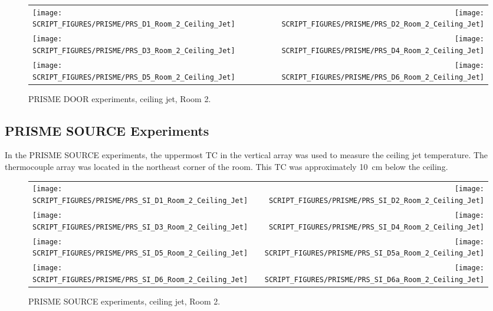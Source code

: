 \newpage

\begin{figure}[p]
\begin{tabular*}{\textwidth}{l@{\extracolsep{\fill}}r}
\texttt{[image: SCRIPT\_FIGURES/PRISME/PRS\_D1\_Room\_2\_Ceiling\_Jet]} &
\texttt{[image: SCRIPT\_FIGURES/PRISME/PRS\_D2\_Room\_2\_Ceiling\_Jet]} \\
\texttt{[image: SCRIPT\_FIGURES/PRISME/PRS\_D3\_Room\_2\_Ceiling\_Jet]} &
\texttt{[image: SCRIPT\_FIGURES/PRISME/PRS\_D4\_Room\_2\_Ceiling\_Jet]} \\
\texttt{[image: SCRIPT\_FIGURES/PRISME/PRS\_D5\_Room\_2\_Ceiling\_Jet]} &
\texttt{[image: SCRIPT\_FIGURES/PRISME/PRS\_D6\_Room\_2\_Ceiling\_Jet]}
\end{tabular*}
\caption{PRISME DOOR experiments, ceiling jet, Room 2.}
\label{PRISME_Ceiling_Jet_Room_2}
\end{figure}

\clearpage


\subsection{PRISME SOURCE Experiments}

In the PRISME SOURCE experiments, the uppermost TC in the vertical array was used to measure the ceiling jet temperature. The thermocouple array was located in the northeast corner of the room. This TC was approximately 10~cm below the ceiling.

\begin{figure}[!h]
\begin{tabular*}{\textwidth}{l@{\extracolsep{\fill}}r}
\texttt{[image: SCRIPT\_FIGURES/PRISME/PRS\_SI\_D1\_Room\_2\_Ceiling\_Jet]} &
\texttt{[image: SCRIPT\_FIGURES/PRISME/PRS\_SI\_D2\_Room\_2\_Ceiling\_Jet]} \\
\texttt{[image: SCRIPT\_FIGURES/PRISME/PRS\_SI\_D3\_Room\_2\_Ceiling\_Jet]} &
\texttt{[image: SCRIPT\_FIGURES/PRISME/PRS\_SI\_D4\_Room\_2\_Ceiling\_Jet]} \\
\texttt{[image: SCRIPT\_FIGURES/PRISME/PRS\_SI\_D5\_Room\_2\_Ceiling\_Jet]} &
\texttt{[image: SCRIPT\_FIGURES/PRISME/PRS\_SI\_D5a\_Room\_2\_Ceiling\_Jet]} \\
\texttt{[image: SCRIPT\_FIGURES/PRISME/PRS\_SI\_D6\_Room\_2\_Ceiling\_Jet]} &
\texttt{[image: SCRIPT\_FIGURES/PRISME/PRS\_SI\_D6a\_Room\_2\_Ceiling\_Jet]}
\end{tabular*}
\caption{PRISME SOURCE experiments, ceiling jet, Room 2.}
\label{PRISME_SOURCE_Ceiling_Jet_Room_1}
\end{figure}

